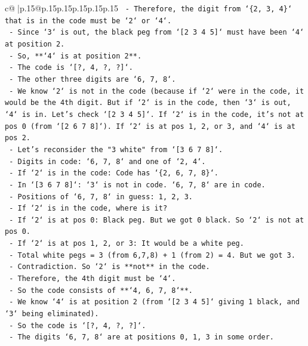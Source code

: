 \documentclass{article}
\begin{document}
{\begin{supertabular}{c@{$\;$}|p{.15\linewidth}@{}p{.15\linewidth}p{.15\linewidth}p{.15\linewidth}p{.15\linewidth}p{.15\linewidth}}
{{{\texttt{    {-} Therefore, the digit from `\{2, 3, 4\}` that is in the code must be `2` or `4`.} \\
\texttt{    {-} Since `3` is out, the black peg from `{[}2 3 4 5{]}` must have been `4` at position 2.} \\
\texttt{    {-} So, **`4` is at position 2**.} \\
\texttt{    {-} The code is `{[}?, 4, ?, ?{]}`.} \\
\texttt{    {-} The other three digits are `6, 7, 8`.} \\
\texttt{    {-} We know `2` is not in the code (because if `2` were in the code, it would be the 4th digit. But if `2` is in the code, then `3` is out, `4` is in. Let's check `{[}2 3 4 5{]}`. If `2` is in the code, it's not at pos 0 (from `{[}2 6 7 8{]}`). If `2` is at pos 1, 2, or 3, and `4` is at pos 2.} \\
\texttt{    {-} Let's reconsider the "3 white" from `{[}3 6 7 8{]}`.} \\
\texttt{        {-} Digits in code: `6, 7, 8` and one of `2, 4`.} \\
\texttt{        {-} If `2` is in the code: Code has `\{2, 6, 7, 8\}`.} \\
\texttt{            {-} In `{[}3 6 7 8{]}`: `3` is not in code. `6, 7, 8` are in code.} \\
\texttt{            {-} Positions of `6, 7, 8` in guess: 1, 2, 3.} \\
\texttt{            {-} If `2` is in the code, where is it?} \\
\texttt{            {-} If `2` is at pos 0: Black peg. But we got 0 black. So `2` is not at pos 0.} \\
\texttt{            {-} If `2` is at pos 1, 2, or 3: It would be a white peg.} \\
\texttt{            {-} Total white pegs = 3 (from 6,7,8) + 1 (from 2) = 4. But we got 3.} \\
\texttt{            {-} Contradiction. So `2` is **not** in the code.} \\
\texttt{        {-} Therefore, the 4th digit must be `4`.} \\
\texttt{        {-} So the code consists of **`4, 6, 7, 8`**.} \\
\texttt{        {-} We know `4` is at position 2 (from `{[}2 3 4 5{]}` giving 1 black, and `3` being eliminated).} \\
\texttt{        {-} So the code is `{[}?, 4, ?, ?{]}`.} \\
\texttt{        {-} The digits `6, 7, 8` are at positions 0, 1, 3 in some order.} \\
}}}
\end{supertabular}}
\end{document}
